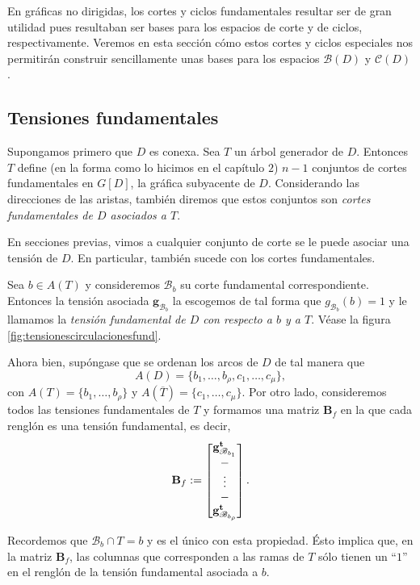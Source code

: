 En gráficas no dirigidas, los cortes y ciclos fundamentales resultar ser de gran utilidad pues resultaban ser bases para los espacios de corte y de ciclos, respectivamente. Veremos en esta sección cómo estos cortes y ciclos especiales nos permitirán construir sencillamente unas bases para los espacios $\mathcal{B}(D)$ y $\mathcal{C}(D)$.

\subsection{Tensiones fundamentales}
Supongamos primero que $D$ es conexa. Sea $T$ un árbol generador de $D$. Entonces $T$ define (en la forma como lo hicimos en el capítulo $2$) $n-1$ conjuntos de cortes fundamentales en $G[D]$, la gráfica subyacente de $D$. Considerando las direcciones de las aristas, también diremos que estos conjuntos son \textit{cortes fundamentales de $D$ asociados a $T$}.

En secciones previas, vimos a cualquier conjunto de corte se le puede asociar una tensión de $D$. En particular, también sucede con los cortes fundamentales.

Sea $b \in A(T)$ y consideremos $\mathscr{B}_{b}$ su corte fundamental correspondiente. Entonces la tensión asociada $\mathbf{g}_{\mathscr{B}_{b}}$ la escogemos de tal forma que $g_{\mathscr{B}_{b}}(b) = 1$ y le llamamos la \textit{tensión fundamental de $D$ con respecto a $b$ y a $T$}. Véase la figura \ref{fig:tensionescirculacionesfund}.

Ahora bien, supóngase que se ordenan los arcos de $D$ de tal manera que $$A(D) = \{b_{1}, \ldots, b_{\rho}, c_{1}, \ldots, c_{\mu}\},$$ con $A(T) = \{b_{1}, \ldots, b_{\rho}\}$ y $A(\overline{T}) = \{c_{1}, \ldots, c_{\mu}\}$. Por otro lado, consideremos todos las tensiones fundamentales de $T$ y formamos una matriz $\mathbf{B}_{f}$ en la que cada renglón es una tensión fundamental, es decir, 
$$
\mathbf{B}_{f} := \begin{bmatrix}
\mathbf{g}_{\mathscr{B}_{b_{1}}}^{\mathbf{t}} \\
\-- \\
\vdots \\
\-- \\
\mathbf{g}_{\mathscr{B}_{b_{\rho}}}^{\mathbf{t}}
\end{bmatrix}.
$$

Recordemos que  $\mathscr{B}_{b} \cap T = b$ y es el único con esta propiedad. Ésto implica que, en la matriz $\mathbf{B}_{f}$, las columnas que corresponden a las ramas de $T$ sólo tienen un ``$1$'' en el renglón de la tensión fundamental asociada a $b$.  

